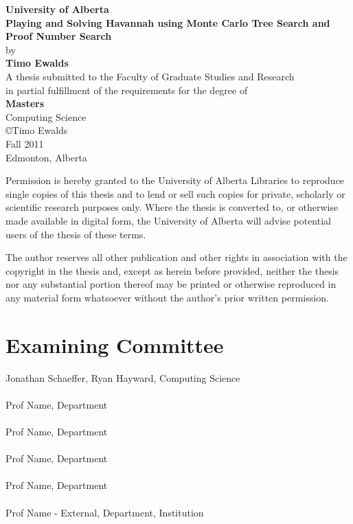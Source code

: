 \documentclass[12pt, letterpaper]{report}
\def\name{Timo Ewalds}
\def\thesistitle{Playing and Solving Havannah using Monte Carlo Tree Search and Proof Number Search}
\def\supervisor{Jonathan Schaeffer, Ryan Hayward}
\def\coma{Prof Name}
\def\comb{Prof Name}
\def\comc{Prof Name}
\def\comd{Prof Name}
\def\come{Prof Name - External}
\def\superloc{Computing Science}
\def\loca{Department}
\def\locb{Department}
\def\locc{Department}
\def\locd{Department}
\def\loce{Department, Institution}
\def\program{Masters}  %
\def\school{University of Alberta}
\def\semester{Fall 2011}  %
\def\dept{Computing Science}  %
\numberwithin{equation}{section}
\begin{document}
	\setcounter{page}{-99}  %
	\thispagestyle{empty}
	

	\begin{center}
		\Large{\textbf{\school}}  \\ [.6in]
		\Large{\textbf{\thesistitle}} \\ [.1in]
		\normalsize{by} \\ [.1in]
		\Large{\textbf{\name}}  \\ [.6in]
		\normalsize{A thesis submitted to the Faculty of Graduate Studies and Research \\ 
		in partial fulfillment of the requirements for the degree of} \\ [0.1in]
		\Large{\textbf{\program}} \\ [.1in]
		\normalsize{\dept} \\ [0.6in]	
		\scriptsize{\copyright\:\name} \\
		\scriptsize{\semester} \\
		\scriptsize{Edmonton, Alberta} \\ [0.6in]	
		\scriptsize{Permission is hereby granted to the University of Alberta Libraries to reproduce single copies of this thesis and to lend or sell such copies for private, scholarly or scientific research purposes only. Where the thesis is converted to, or otherwise made available in digital form, the University of Alberta will advise potential users of the thesis of these terms.
		
The author reserves all other publication and other rights in association with the copyright in the thesis and, except as herein before provided, neither the thesis nor any substantial portion thereof may be printed or otherwise reproduced in any material form whatsoever without the author's prior written permission.}
	\end{center}

	\newpage
	\chapter*{Examining Committee}
	\thispagestyle{empty}
 		\supervisor, \; \superloc \\ \\
 		\coma, \; \loca \\ \\
 		\comb, \; \locb \\ \\
 		\comc, \; \locc \\ \\
 		\comd, \; \locd \\ \\
 		\come, \; \loce
	
\end{document}

